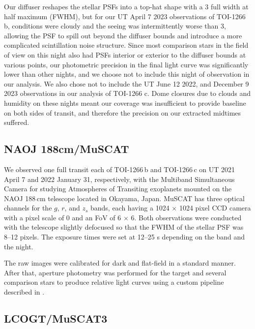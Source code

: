 \documentclass[twocolumn]{aastex631}
\begin{document}
Our diffuser reshapes the stellar PSFs into a top-hat shape with a 3 full width at half maximum (FWHM), but for our UT April 7 2023 observations of TOI-1266 b, conditions were cloudy and the seeing was intermittently worse than 3, allowing the PSF to spill out beyond the diffuser bounds and introduce a more complicated scintillation noise structure. Since most comparison stars in the field of view on this night also had PSFs interior or exterior to the diffuser bounds at various points, our photometric precision in the final light curve was significantly lower than other nights, and we choose not to include this night of observation in our analysis. We also chose not to include the UT June 12 2022, and December 9 2023 observations in our analysis of TOI-1266 c. Dome closures due to clouds and humidity on these nights meant our coverage was insufficient to provide baseline on both sides of transit, and therefore the precision on our extracted midtimes suffered. 

\subsection{NAOJ 188cm/MuSCAT}

We observed one full transit each of TOI-1266\,b and TOI-1266\,c on UT 2021 April 7 and 2022 January 31, respectively, with the Multiband Simultaneous Camera for studying Atmospheres of Transiting exoplanets \citep[MuSCAT;][]{2015JATIS...1d5001N} mounted on the NAOJ 188\,cm telescope located in Okayama, Japan. MuSCAT has three optical channels for the $g$, $r$, and $z_s$ bands, each having a 1024 $\times$ 1024 pixel CCD camera with a pixel scale of 0 and an FoV of 6 $\times$ 6. Both observations were conducted with the telescope slightly defocused so that the FWHM of the stellar PSF was 8--12 pixels. The exposure times were set at 12--25 s depending on the band and the night.

The raw images were calibrated for dark and flat-field in a standard manner. After that, aperture photometry was performed for the target and several comparison stars to produce relative light curves using a custom pipeline described in \citet{2011PASJ...63..287F}. 


\subsection{LCOGT/MuSCAT3}
\end{document}

